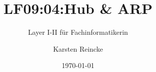 \documentclass[]{beamer}
\title{LF09:04:Hub \& ARP }
\subtitle{Layer I-II für Fachinformatikerin}
\institute[GS-LDK]{Gewerbliche Schulen Dillenburg}
\author{Karsten Reincke}
\date{\today}
\def\cfgGl{../../../cfg.gl/}
\begin{document}

\begin{frame}
  \titlepage

  
\end{frame}






\logo{}
\newpage



%
\end{document}
